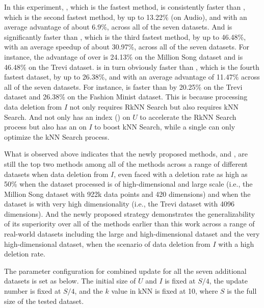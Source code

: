 In this experiment, \cpdualtree, which is the fastest method, is consistently faster than \spdualtree, which is the second fastest method, by up to 13.22\% (on Audio), and with an average advantage of about 6.9\%, across all of the seven datasets. And \spdualtree is significantly faster than \dualtree, which is the third fastest method, by up to 46.48\%, with an average speedup of about 30.97\%, across all of the seven datasets. For instance, the advantage of \spdualtree over \dualtree is 24.13\% on the Million Song dataset and is 46.48\% on the Trevi dataset. \dualtree is in turn obviously faster than \deltatree, which is the fourth fastest dataset, by up to 26.38\%, and with an average advantage of 11.47\% across all of the seven datasets. For instance, \dualtree is faster than \deltatree by 20.25\% on the Trevi dataset and 26.38\% on the Fashion Minist dataset. This is because processing data deletion from $I$ not only requires RkNN Search but also requires kNN Search. And \dualtree not only has an index (\hdrtree) on $U$ to accelerate the RkNN Search process but also has an \deltatree on $I$ to boost kNN Search, while a single \deltatree can only optimize the kNN Search process.

What is observed above indicates that the newly proposed methods, \cpdualtree and \spdualtree, are still the top two methods among all of the methods across a range of different datasets when data deletion from $I$, even faced with a deletion rate as high as 50\% when the dataset processed is of high-dimensional and large scale (i.e., the Million Song dataset with 922k data points and 420 dimensions) and when the dataset is with very high dimensionality (i.e., the Trevi dataset with 4096 dimensions). And the newly proposed \dualtree strategy demonstrates the generalizability of its superiority over all of the methods earlier than this work across a range of real-world datasets including the large and high-dimensional dataset and the very high-dimensional dataset, when the scenario of data deletion from $I$ with a high deletion rate. 


The parameter configuration for combined update for all the seven additional datasets is set as below. The initial size of $U$ and $I$ is fixed at $S/4$, the update number is fixed at $S/4$, and the $k$ value in kNN is fixed at 10, where $S$ is the full size of the tested dataset.

